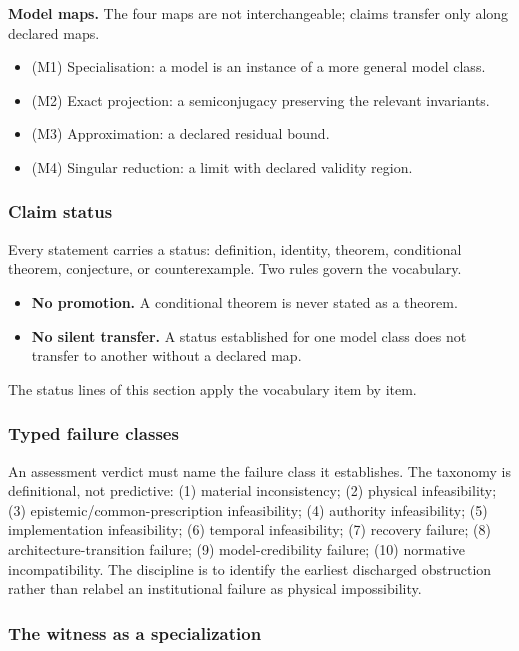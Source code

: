 \textbf{Model maps.} The four maps are not interchangeable; claims transfer only along declared maps.

\begin{itemize}[leftmargin=2em]
\item (M1) Specialisation: a model is an instance of a more general model class.
\item (M2) Exact projection: a semiconjugacy preserving the relevant invariants.
\item (M3) Approximation: a declared residual bound.
\item (M4) Singular reduction: a limit with declared validity region.
\end{itemize}

\subsubsection{Claim status}

Every statement carries a status: definition, identity, theorem, conditional theorem, conjecture, or counterexample. Two rules govern the vocabulary.

\begin{itemize}[leftmargin=2em]
\item \textbf{No promotion.} A conditional theorem is never stated as a theorem.
\item \textbf{No silent transfer.} A status established for one model class does not transfer to another without a declared map.
\end{itemize}

The status lines of this section apply the vocabulary item by item.

\subsubsection{Typed failure classes}

An assessment verdict must name the failure class it establishes. The taxonomy is definitional, not predictive: (1) material inconsistency; (2) physical infeasibility; (3) epistemic/common-prescription infeasibility; (4) authority infeasibility; (5) implementation infeasibility; (6) temporal infeasibility; (7) recovery failure; (8) architecture-transition failure; (9) model-credibility failure; (10) normative incompatibility. The discipline is to identify the earliest discharged obstruction rather than relabel an institutional failure as physical impossibility.

\subsubsection{The witness as a specialization}

